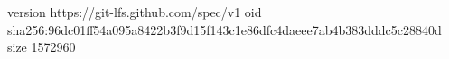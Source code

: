 version https://git-lfs.github.com/spec/v1
oid sha256:96dc01ff54a095a8422b3f9d15f143c1e86dfc4daeee7ab4b383dddc5c28840d
size 1572960
